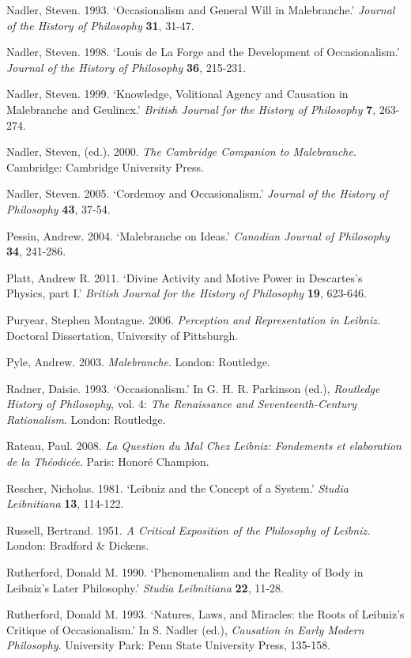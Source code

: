 \documentclass{article}
\begin{document}
Nadler, Steven. 1993. `Occasionalism and General Will in Malebranche.'
\emph{Journal of the History of Philosophy} \textbf{31}, 31-47.

Nadler, Steven. 1998. `Louis de La Forge and the Development of
Occasionalism.' \emph{Journal of the History of Philosophy} \textbf{36},
215-231.

Nadler, Steven. 1999. `Knowledge, Volitional Agency and Causation in
Malebranche and Geulincx.' \emph{British Journal for the History of
Philosophy} \textbf{7}, 263-274.

Nadler, Steven, (ed.). 2000. \emph{The Cambridge Companion to
Malebranche}. Cambridge: Cambridge University Press.

Nadler, Steven. 2005. `Cordemoy and Occasionalism.' \emph{Journal of the
History of Philosophy} \textbf{43}, 37-54.

Pessin, Andrew. 2004. `Malebranche on Ideas.' \emph{Canadian Journal of
Philosophy} \textbf{34}, 241-286.

Platt, Andrew R. 2011. `Divine Activity and Motive Power in Descartes's
Physics, part I.' \emph{British Journal for the History of Philosophy}
\textbf{19}, 623-646.

Puryear, Stephen Montague. 2006. \emph{Perception and Representation in
Leibniz}. Doctoral Dissertation, University of Pittsburgh.

Pyle, Andrew. 2003. \emph{Malebranche}. London: Routledge.

Radner, Daisie. 1993. `Occasionalism.' In G. H. R. Parkinson (ed.),
\emph{Routledge History of Philosophy}, vol. 4: \emph{The Renaissance
and Seventeenth-Century Rationalism}. London: Routledge.

Rateau, Paul. 2008. \emph{La Question du Mal Chez Leibniz: Fondements et
elaboration de la Théodicée}. Paris: Honoré Champion.

Rescher, Nicholas. 1981. `Leibniz and the Concept of a System.'
\emph{Studia Leibnitiana} \textbf{13}, 114-122.

Russell, Bertrand. 1951. \emph{A Critical Exposition of the Philosophy
of Leibniz.} London: Bradford \& Dickens.

Rutherford, Donald M. 1990. `Phenomenalism and the Reality of Body in
Leibniz's Later Philosophy.' \emph{Studia Leibnitiana} \textbf{22},
11-28.

Rutherford, Donald M. 1993. `Natures, Laws, and Miracles: the Roots of
Leibniz's Critique of Occasionalism.' In S. Nadler (ed.),
\emph{Causation in Early Modern Philosophy}. University Park: Penn State
University Press, 135-158.
\end{document}
